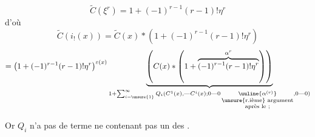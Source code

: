 \[
\widetilde C(\xi^r)=1+(-1)^{r-1}(r-1)!\eta^r
\]
d'où
\[
\widetilde C(i_!(x))=\widetilde C(x)*(1+(-1)^{r-1}(r-1)!\eta^r)
\]
\[
=\bigl(1+(-1)^{r-1}(r-1)!\eta^r\bigr)^{\varepsilon(x)}
\underbrace{\left(C(x)*\left(1+\overbrace{(-1)^{r-1}(r-1)!\eta^r}^{\alpha^r}\right)\right)}_{
1+\sum_{i=\unsure{1}}^\infty Q_i(C^1(x),\mathrel{\text{---}}C^i(x);0\mathrel{\text{---}}0\,\underset{\substack{\text{\unsure{r.ième} argument}\\\text{après le ;}}}{\uuline{\alpha^{(r)}}},0\mathrel{\text{---}}0)}
\]

Or $Q_i$ n'a pas de terme ne contenant pas un des .

